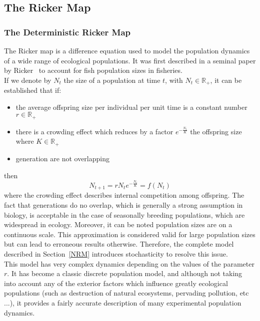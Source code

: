 \documentclass[12pt]{article}
\begin{document}
	\subsection{The Ricker Map}  \label{rickerGen}
	\subsubsection{The Deterministic Ricker Map}
	The Ricker map is a difference equation used to model the population dynamics of a wide range of ecological populations. It was first described in a seminal paper by Ricker~\cite{Ricker1954} to account for fish population sizes in fisheries. \\
	If we denote by $N_t$ the size of a population at time $t$, with $N_t \in \mathbb{R}_+$, it can be established that if:
	\begin{itemize}
	\item the average offspring size per individual per unit time is a constant number $r \in \mathbb{R}_+$
	\item there is a crowding effect which reduces by a factor $e^{-\frac{N_t}{K}}$ the offspring size where $K \in \mathbb{R}_+$
	\item generation are not overlapping
	\end{itemize}
	then 
	\begin{equation} 
	N_{t+1} = r N_t e^{-\frac{N_t}{K}} = f(N_t)
	\label{eq:ricker}
	\end{equation}
	where the crowding effect describes internal competition among offspring.
	The fact that generations do no overlap, which is generally a strong assumption in biology, is acceptable in the case of seasonally breeding populations, which are widespread in ecology. Moreover, it can be noted population sizes are on a continuous scale. This approximation is considered valid for large population sizes but can lead to erroneous results otherwise. Therefore, the complete model described in Section~\ref{NRM} introduces stochasticity to resolve this issue.  \\
	This model has very complex dynamics depending on the values of the parameter $r$. It has become a classic discrete population model, and although not taking into account any of the exterior factors which influence greatly ecological populations (such as destruction of natural ecosystems, pervading pollution, etc ...), it provides a fairly accurate description of many experimental population dynamics.
	
\end{document}
